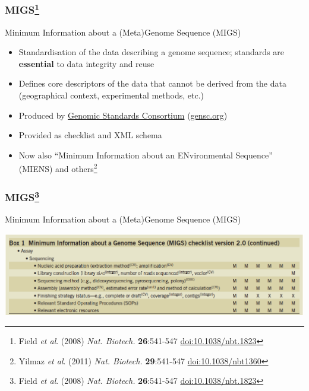 \begin{frame}
  \frametitle{MIGS\footnote{\tiny{Field \textit{et al}. (2008) \textit{Nat. Biotech.} \textbf{26}:541-547 \href{http://dx.doi.org/10.1038/nbt.1823}{doi:10.1038/nbt.1823}}}}
  Minimum Information about a (Meta)Genome Sequence (MIGS) \\
  \begin{itemize}
    \item Standardisation of the data describing a genome sequence; standards are \textbf{essential} to data integrity and reuse
    \item Defines core descriptors of the data that cannot be derived from the data (geographical context, experimental methods, etc.)
    \item Produced by \href{http://en.wikipedia.org/wiki/Genomic_Standards_Consortium}{Genomic Standards Consortium} (\href{http://gensc.org/}{gensc.org})
    \item Provided as checklist and XML schema
    \item Now also ``Minimum Information about an ENvironmental Sequence'' (MIENS) and others\footnote{\tiny{Yilmaz \textit{et al}. (2011) \textit{Nat. Biotech.} \textbf{29}:541-547 \href{http://dx.doi.org/10.1038/nbt1360}{doi:10.1038/nbt1360}}}
  \end{itemize}        
\end{frame}

\begin{frame}
  \frametitle{MIGS\footnote{\tiny{Field \textit{et al}. (2008) \textit{Nat. Biotech.} \textbf{26}:541-547 \href{http://dx.doi.org/10.1038/nbt.1823}{doi:10.1038/nbt.1823}}}}
  Minimum Information about a (Meta)Genome Sequence (MIGS) \\
  \begin{center}
    \includegraphics[width=1\textwidth]{images/migs_table}
  \end{center}           
\end{frame}